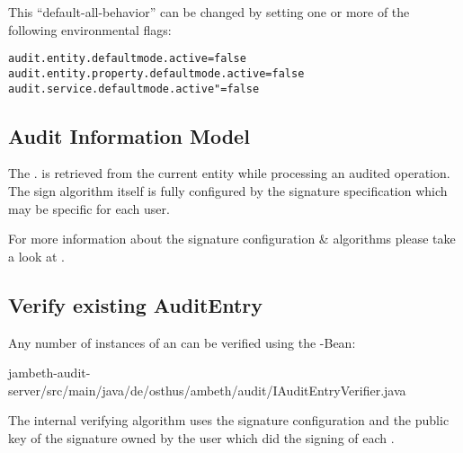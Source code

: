 This ``default-all-behavior'' can be changed by setting one or more of the following environmental flags:
\begin{lstlisting}[style=Props]
audit.entity.defaultmode.active=false
audit.entity.property.defaultmode.active=false
audit.service.defaultmode.active"=false
\end{lstlisting}

\subsection{Audit Information Model}

\def\showimgref{img/gen/2014-10-04-DeK-Ambeth-Audit-3}

The . is retrieved from the current  entity while processing an audited operation. The sign algorithm itself is fully configured by the signature specification which may be specific for each user.


\def\showimgref{img/gen/2014-10-04-DeK-Ambeth-Audit-4}

For more information about the signature configuration \& algorithms please take a look at .

\subsection{Verify existing AuditEntry}
Any number of instances of an  can be verified using the -Bean:

	{jambeth-audit-server/src/main/java/de/osthus/ambeth/audit/IAuditEntryVerifier.java}

The internal verifying algorithm uses the signature configuration and the public key of the signature owned by the user which did the signing of each .

